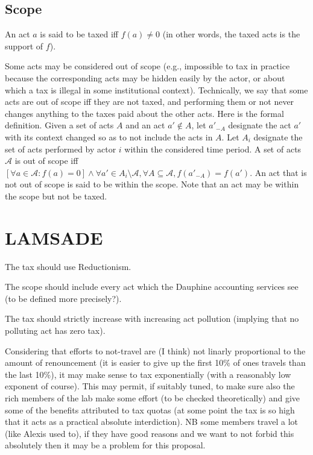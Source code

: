 \documentclass[version=3.21, pagesize, twoside=off, bibliography=totoc, DIV=calc, fontsize=12pt, a4paper, french, english]{scrartcl}
\begin{document}
\subsection{Scope}
An act $a$ is said to be taxed iff $f(a) ≠ 0$ (in other words, the taxed acts is the support of $f$).

Some acts may be considered out of scope (e.g., impossible to tax in practice because the corresponding acts may be hidden easily by the actor, or about which a tax is illegal in some institutional context). Technically, we say that some acts are out of scope iff they are not taxed, and performing them or not never changes anything to the taxes paid about the other acts. Here is the formal definition. Given a set of acts $A$ and an act $a' \notin A$, let $a'_{-A}$ designate the act $a'$ with its context changed so as to not include the acts in $A$. Let $A_i$ designate the set of acts performed by actor $i$ within the considered time period. A set of acts $\mathcal{A}$ is out of scope iff $[\forall a \in \mathcal{A}: f(a) = 0] \land \forall a' \in A_i \setminus \mathcal{A}, \forall A \subseteq \mathcal{A}, f(a'_{-A}) = f(a')$.
An act that is not out of scope is said to be within the scope. Note that an act may be within the scope but not be taxed.

\section{LAMSADE}
The tax should use Reductionism.

The scope should include every act which the Dauphine accounting services see (to be defined more precisely?).

The tax should strictly increase with increasing act pollution (implying that no polluting act has zero tax).

Considering that efforts to not-travel are (I think) not linarly proportional to the amount of renouncement (it is easier to give up the first 10\% of ones travels than the last 10\%), it may make sense to tax exponentially (with a reasonably low exponent of course). This may permit, if suitably tuned, to make sure also the rich members of the lab make some effort (to be checked theoretically) and give some of the benefits attributed to tax quotas (at some point the tax is so high that it acts as a practical absolute interdiction). NB some members travel a lot (like Alexis used to), if they have good reasons and we want to not forbid this absolutely then it may be a problem for this proposal.
\end{document}
